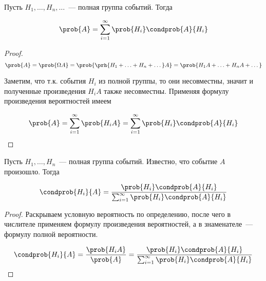 
\begin{theorem}
  Пусть \(H_1, \dotsc, H_n, \dotsc\)~--- полная группа событий. Тогда

  \begin{equation*}
    \prob{A} = \sum_{i = 1}^{\infty} \prob{H_i} \condprob{A}{H_i}
  \end{equation*}
\end{theorem}

\begin{proof}
  \begin{equation*}
    \prob{A}
    = \prob{\Omega A}
    = \prob{\prh{H_1 + \dotsc + H_n + \dotsc} A}
    = \prob{H_1 A + \dotsc + H_n A + \dotsc}
  \end{equation*}

  Заметим, что т.к. события \(H_i\) из полной группы, то они несовместны, значит
  и полученные произведения \(H_i A\) также несовместны. Применяя формулу
  произведения вероятностей имеем

  \begin{equation*}
    \prob{A}
    = \sum_{i = 1}^{\infty} \prob{H_i A}
    = \sum_{i = 1}^{\infty} \prob{H_i} \condprob{A}{H_i}
  \end{equation*}
\end{proof}


\begin{theorem}
  Пусть \(H_1, \dotsc, H_n\)~--- полная группа событий. Известно, что событие
  \(A\) произошло. Тогда

  \begin{equation*}
    \condprob{H_i}{A}
    = \frac{\prob{H_i} \condprob{A}{H_i}}
      {\sum_{i = 1}^{\infty} \prob{H_i} \condprob{A}{H_i}}
  \end{equation*}
\end{theorem}

\begin{proof}
  Раскрываем условную вероятность по определению, после чего в числителе
  применяем формулу произведения вероятностей, а в знаменателе~--- формулу
  полной вероятности.

  \begin{equation*}
    \condprob{H_i}{A}
    = \frac{\prob{H_i A}}{\prob{A}}
    = \frac{\prob{H_i} \condprob{A}{H_i}}
      {\sum_{i = 1}^{\infty} \prob{H_i} \condprob{A}{H_i}}
  \end{equation*}
\end{proof}

